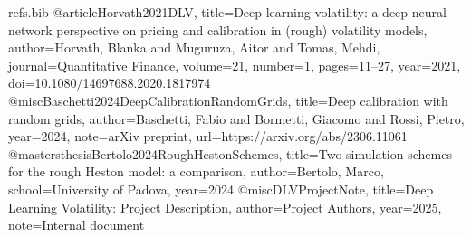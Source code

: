 \begin{filecontents*}{refs.bib}
	@article{Horvath2021DLV,
		title={Deep learning volatility: a deep neural network perspective on pricing and calibration in (rough) volatility models},
		author={Horvath, Blanka and Muguruza, Aitor and Tomas, Mehdi},
		journal={Quantitative Finance},
		volume={21}, number={1}, pages={11--27}, year={2021},
		doi={10.1080/14697688.2020.1817974}
	}
	@misc{Baschetti2024DeepCalibrationRandomGrids,
		title={Deep calibration with random grids},
		author={Baschetti, Fabio and Bormetti, Giacomo and Rossi, Pietro},
		year={2024}, note={arXiv preprint}, url={https://arxiv.org/abs/2306.11061}
	}
	@mastersthesis{Bertolo2024RoughHestonSchemes,
		title={Two simulation schemes for the rough Heston model: a comparison},
		author={Bertolo, Marco}, school={University of Padova}, year={2024}
	}
	@misc{DLVProjectNote,
		title={Deep Learning Volatility: Project Description},
		author={Project Authors},
		year={2025}, note={Internal document}
	}
	
\end{filecontents*}

\documentclass[11pt,a4paper]{report}
\usepackage[english]{babel}
\usepackage{csquotes}
\usepackage[margin=1in]{geometry}
\usepackage{microtype}
\usepackage{amsmath,amssymb,mathtools}
\usepackage{graphicx}
\usepackage{subcaption}
\usepackage{booktabs}
\usepackage{siunitx}
\usepackage{tikz}
\usepackage{listings}
\usepackage{xcolor}
\usepackage{enumitem}
\usepackage{hyperref}
\usepackage[nameinlink,capitalise]{cleveref}
\usepackage[backend=biber,style=authoryear,maxbibnames=6,natbib=true]{biblatex}



\newcommand{\TODO}[1]{\textcolor{red!70!black}{\textbf{TODO:}~#1}}

